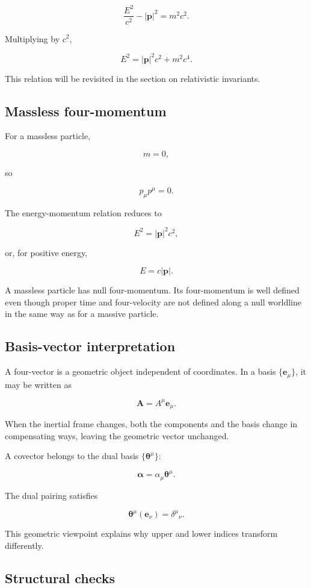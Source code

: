 \[
\frac{E^{2}}{c^{2}}
-|
\mathbf{p}|^{2}
=
m^{2}c^{2}.
\]

Multiplying by \(c^{2}\),

\[
\boxed{
E^{2}
=
|
\mathbf{p}|^{2}c^{2}
+
m^{2}c^{4}
}.
\]

This relation will be revisited in the section on relativistic invariants.

\subsection{Massless four-momentum}

For a massless particle,

\[
m=0,
\]

so

\[
p_{\mu}p^{\mu}=0.
\]

The energy-momentum relation reduces to

\[
E^{2}=|
\mathbf{p}|^{2}c^{2},
\]

or, for positive energy,

\[
\boxed{
E=c|
\mathbf{p}|
}.
\]

A massless particle has null four-momentum. Its four-momentum is well defined even though proper time and four-velocity are not defined along a null worldline in the same way as for a massive particle.

\subsection{Basis-vector interpretation}

A four-vector is a geometric object independent of coordinates. In a basis \(\{\mathbf{e}_{\mu}\}\), it may be written as

\[
\mathbf{A}
=
A^{\mu}\mathbf{e}_{\mu}.
\]

When the inertial frame changes, both the components and the basis change in compensating ways, leaving the geometric vector unchanged.

A covector belongs to the dual basis \(\{\boldsymbol{\theta}^{\mu}\}\):

\[
\boldsymbol{\alpha}
=
\alpha_{\mu}\boldsymbol{\theta}^{\mu}.
\]

The dual pairing satisfies

\[
\boldsymbol{\theta}^{\mu}(\mathbf{e}_{\nu})
=
\delta^{\mu}{}_{\nu}.
\]

This geometric viewpoint explains why upper and lower indices transform differently.

\subsection{Structural checks}

